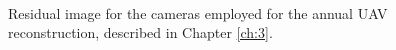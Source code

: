 \begin{figure}[hb]
{  } \\ \vspace{2mm}
  \caption[]{Residual image for the cameras employed for the annual UAV reconstruction, described in Chapter \ref{ch:3}.}
  \label{fig:app:camera_residuals_uav1}
\end{figure}

